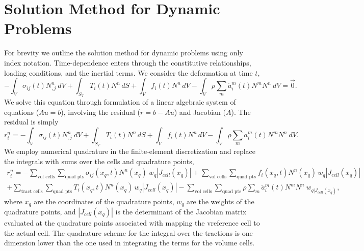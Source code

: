 \section{Solution Method for Dynamic Problems}

For brevity we outline the solution method for dynamic problems using
only index notation. Time-dependence enters through the constitutive
relationships, loading conditions, and the inertial terms. We consider
the deformation at time $t$,
\begin{equation}
-\int_{V}\sigma_{ij}(t)N_{,j}^{n}\: dV+\int_{S_{T}}T_{i}(t)N^{n}\, dS+\int_{V}f_{i}(t)N^{n}\, dV-\int_{V}\rho\sum_{m}\ddot{a}_{i}^{m}(t)N^{m}N^{n}\ dV=\vec{0}.\label{eq:elasticity:integral:dynamic:t}
\end{equation}
We solve this equation through formulation of a linear algebraic system
of equations ($Au=b$), involving the residual ($r=b-Au$) and Jacobian
($A$). The residual is simply
\begin{equation}
r_{i}^{n}=-\int_{V}\sigma_{ij}(t)N_{,j}^{n}\: dV+\int_{S_{T}}T_{i}(t)N^{n}\, dS+\int_{V}f_{i}(t)N^{n}\, dV-\int_{V}\rho\sum_{m}\ddot{a}_{i}^{m}(t)N^{m}N^{n}\ dV.
\end{equation}
We employ numerical quadrature in the finite-element discretization
and replace the integrals with sums over the cells and quadrature
points,
\begin{multline}
r_{i}^{n}=-\sum_{\text{vol cells}}\sum_{\text{quad pts}}\sigma_{ij}(x_{q},t)N^{n}(x_{q})\: w_{q}|J_{cell}(x_{q})|+\sum_{\text{vol cells}}\sum_{\text{quad pt}s}f_{i}(x_{q},t)N^{n}(x_{q})\, w_{q}|J_{cell}(x_{q})|\\
+\sum_{\text{tract cells}}\sum_{\text{quad pts}}T_{i}(x_{q},t)N^{n}(x_{q})\, w_{q}|J_{cell}(x_{q})|-\sum_{\text{vol cells}}\sum_{\text{quad pts}}\rho\sum_{m}\ddot{a}_{i}^{m}(t)N^{m}N^{n}\ w_{q|J_{cell}(x_{q})},
\end{multline}
where $x_{q}$ are the coordinates of the quadrature points, $w_{q}$
are the weights of the quadrature points, and $|J_{cell}(x_{q})|$
is the determinant of the Jacobian matrix evaluated at the quadrature
points associated with mapping the vreference cell to the actual cell.
The quadrature scheme for the integral over the tractions is one dimension
lower than the one used in integrating the terms for the volume cells. 

